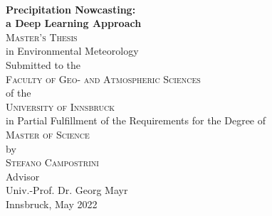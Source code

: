 \begin{titlepage}
\begin{center}

~\\[15mm]
{\Huge  {\bf Precipitation Nowcasting:}}\\[5mm]


{\LARGE {\bf a Deep Learning Approach}}\\[15mm]


{\Large \textsc{Master's Thesis}} \\[15mm]


{\large in Environmental Meteorology} \\[15mm]


{\large Submitted to the} \\[2mm]
{\Large \textsc{Faculty of Geo- and Atmospheric Sciences}} \\[2mm]
{\large of the} \\[2mm]
{\Large \textsc{University of Innsbruck}} \\[15mm]


{\large in Partial Fulfillment of the Requirements for the Degree of} \\[2mm]
{\Large \textsc{Master of Science}} \\[15mm]


{\large by} \\[2mm]
{\Large \textsc{Stefano Campostrini}} \\[15mm]


{\large Advisor} \\[2mm]
{\large Univ.-Prof. Dr. Georg Mayr} \\[15mm]


{\large Innsbruck, May 2022}


\end{center}
\end{titlepage}
